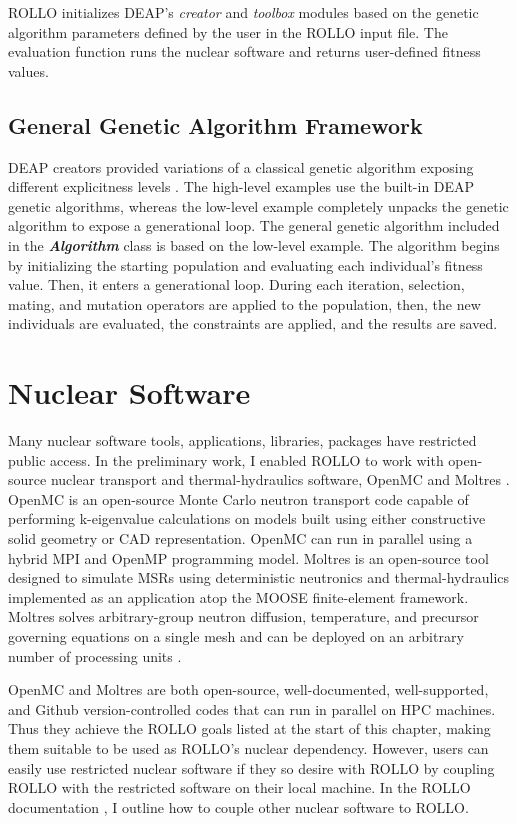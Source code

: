 \gls{ROLLO} initializes \gls{DEAP}'s \textit{creator} and \textit{toolbox} modules 
based on the genetic algorithm parameters defined by the user in the \gls{ROLLO} 
input file. 
The evaluation function runs the nuclear software and returns user-defined 
fitness values. 

\subsection{General Genetic Algorithm Framework}
\gls{DEAP} creators provided variations of a classical genetic algorithm 
exposing different explicitness levels \cite{fortin_deap_2012}. 
The high-level examples use the built-in \gls{DEAP} genetic algorithms, 
whereas the low-level example completely unpacks the genetic algorithm to expose 
a generational loop. 
The general genetic algorithm included in the \textbf{\textit{Algorithm}} class 
is based on the low-level example. 
The algorithm begins by initializing the starting population and evaluating 
each individual's fitness value. 
Then, it enters a generational loop. 
During each iteration, selection, mating, and mutation operators are applied to 
the population, then, the new individuals are evaluated, the constraints are 
applied, and the results are saved.

\section{Nuclear Software}
Many nuclear software tools, applications, libraries, packages have restricted 
public access. 
In the preliminary work, I enabled \gls{ROLLO} to work with open-source nuclear 
transport and thermal-hydraulics software, OpenMC \cite{romano_openmc_2013} 
and Moltres \cite{lindsay_introduction_2018}.  
OpenMC is an open-source Monte Carlo neutron transport code capable of 
performing k-eigenvalue calculations on models built using either constructive 
solid geometry or CAD representation. 
OpenMC can run in parallel using a hybrid \gls{MPI} and OpenMP programming model. 
Moltres is an open-source tool designed to simulate \glspl{MSR} using 
deterministic neutronics and thermal-hydraulics implemented as an application 
atop the \gls{MOOSE} finite-element framework.  
Moltres solves arbitrary-group neutron diffusion, temperature, and precursor 
governing equations on a single mesh and can be deployed on an arbitrary number 
of processing units \cite{lindsay_introduction_2018}.

OpenMC and Moltres are both open-source, well-documented, well-supported, and 
Github version-controlled codes that can run in parallel on \gls{HPC} machines.
Thus they achieve the \gls{ROLLO} goals listed at the start of this chapter, 
making them suitable to be used as \gls{ROLLO}'s nuclear dependency.
However, users can easily use restricted nuclear software if they so desire 
with \gls{ROLLO} by coupling \gls{ROLLO} with the restricted software on their 
local machine. 
In the \gls{ROLLO} documentation \cite{chee_documentation_2021}, I outline how to couple 
other nuclear software to \gls{ROLLO}. 

